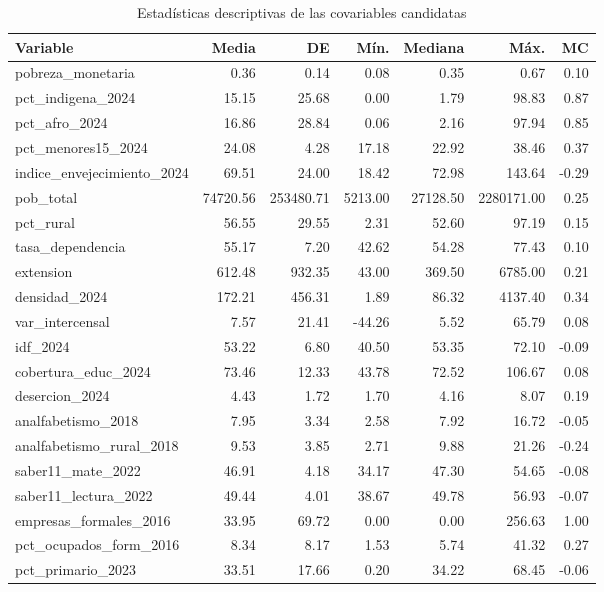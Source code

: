 
\begin{longtable}[t]{lrrrrrr}
\caption{\label{tab:descriptivo-cuanti}Estadísticas descriptivas de las covariables candidatas}\\
\toprule
Variable & Media & DE & Mín. & Mediana & Máx. & MC\\
\midrule
pobreza\_monetaria & 0.36 & 0.14 & 0.08 & 0.35 & 0.67 & 0.10\\
pct\_indigena\_2024 & 15.15 & 25.68 & 0.00 & 1.79 & 98.83 & 0.87\\
pct\_afro\_2024 & 16.86 & 28.84 & 0.06 & 2.16 & 97.94 & 0.85\\
pct\_menores15\_2024 & 24.08 & 4.28 & 17.18 & 22.92 & 38.46 & 0.37\\
indice\_envejecimiento\_2024 & 69.51 & 24.00 & 18.42 & 72.98 & 143.64 & -0.29\\
\addlinespace
pob\_total & 74720.56 & 253480.71 & 5213.00 & 27128.50 & 2280171.00 & 0.25\\
pct\_rural & 56.55 & 29.55 & 2.31 & 52.60 & 97.19 & 0.15\\
tasa\_dependencia & 55.17 & 7.20 & 42.62 & 54.28 & 77.43 & 0.10\\
extension & 612.48 & 932.35 & 43.00 & 369.50 & 6785.00 & 0.21\\
densidad\_2024 & 172.21 & 456.31 & 1.89 & 86.32 & 4137.40 & 0.34\\
\addlinespace
var\_intercensal & 7.57 & 21.41 & -44.26 & 5.52 & 65.79 & 0.08\\
idf\_2024 & 53.22 & 6.80 & 40.50 & 53.35 & 72.10 & -0.09\\
cobertura\_educ\_2024 & 73.46 & 12.33 & 43.78 & 72.52 & 106.67 & 0.08\\
desercion\_2024 & 4.43 & 1.72 & 1.70 & 4.16 & 8.07 & 0.19\\
analfabetismo\_2018 & 7.95 & 3.34 & 2.58 & 7.92 & 16.72 & -0.05\\
\addlinespace
analfabetismo\_rural\_2018 & 9.53 & 3.85 & 2.71 & 9.88 & 21.26 & -0.24\\
saber11\_mate\_2022 & 46.91 & 4.18 & 34.17 & 47.30 & 54.65 & -0.08\\
saber11\_lectura\_2022 & 49.44 & 4.01 & 38.67 & 49.78 & 56.93 & -0.07\\
empresas\_formales\_2016 & 33.95 & 69.72 & 0.00 & 0.00 & 256.63 & 1.00\\
pct\_ocupados\_form\_2016 & 8.34 & 8.17 & 1.53 & 5.74 & 41.32 & 0.27\\
\addlinespace
pct\_primario\_2023 & 33.51 & 17.66 & 0.20 & 34.22 & 68.45 & -0.06\\

\end{longtable}
